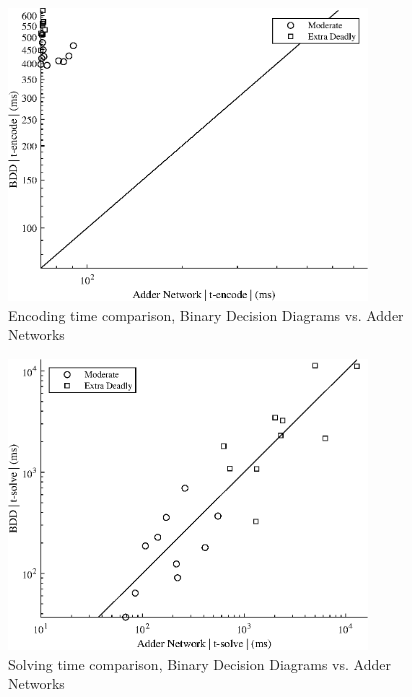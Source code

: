 {\begin{figure}
    \centering
    \includegraphics[width = 0.85\textwidth]{Figures/killer_encode_compare.eps}
    \caption{Encoding time comparison, Binary Decision Diagrams vs. Adder Networks}
    \label{killerCompareEncode}
\end{figure}

\begin{figure}
    \centering
    \includegraphics[width = 0.85\textwidth]{Figures/killer_solve_compare.eps}
    \caption{Solving time comparison, Binary Decision Diagrams vs. Adder Networks}
    \label{killerCompareSolve}
\end{figure}
}

